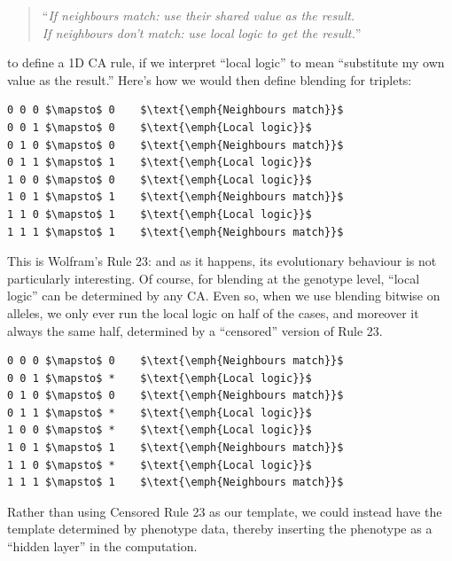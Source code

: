\documentclass{AISB2008}
\begin{document}
\begin{quote}
``\emph{If neighbours match:} \emph{use their shared value as the result.}\\
 \emph{If neighbours don't match:} \emph{use local logic to get the result.}''
\end{quote}

\noindent to define a 1D CA rule, if we interpret ``local logic'' to
mean ``substitute my own value as the result.''  Here's how we would
then define blending for triplets:

\lstset{
  xleftmargin=.2\columnwidth, xrightmargin=.01\columnwidth
}

\begin{lstlisting}[mathescape]
0 0 0 $\mapsto$ 0    $\text{\emph{Neighbours match}}$
0 0 1 $\mapsto$ 0    $\text{\emph{Local logic}}$
0 1 0 $\mapsto$ 0    $\text{\emph{Neighbours match}}$
0 1 1 $\mapsto$ 1    $\text{\emph{Local logic}}$
1 0 0 $\mapsto$ 0    $\text{\emph{Local logic}}$
1 0 1 $\mapsto$ 1    $\text{\emph{Neighbours match}}$
1 1 0 $\mapsto$ 1    $\text{\emph{Local logic}}$
1 1 1 $\mapsto$ 1    $\text{\emph{Neighbours match}}$
\end{lstlisting}

This is Wolfram's Rule 23: and as it happens, its evolutionary
behaviour is not particularly interesting.  Of course, for blending at
the genotype level, ``local logic'' can be determined by any CA.  Even
so, when we use blending bitwise on alleles, we only ever run the
local logic on half of the cases, and moreover it always the same
half, determined by a ``censored'' version of Rule 23.

\begin{lstlisting}[mathescape]
0 0 0 $\mapsto$ 0    $\text{\emph{Neighbours match}}$
0 0 1 $\mapsto$ *    $\text{\emph{Local logic}}$
0 1 0 $\mapsto$ 0    $\text{\emph{Neighbours match}}$
0 1 1 $\mapsto$ *    $\text{\emph{Local logic}}$
1 0 0 $\mapsto$ *    $\text{\emph{Local logic}}$
1 0 1 $\mapsto$ 1    $\text{\emph{Neighbours match}}$
1 1 0 $\mapsto$ *    $\text{\emph{Local logic}}$
1 1 1 $\mapsto$ 1    $\text{\emph{Neighbours match}}$
\end{lstlisting}

Rather than using Censored Rule 23 as our template, we could instead
have the template determined by phenotype data, thereby inserting the
phenotype as a ``hidden layer'' in the computation.
\end{document}
